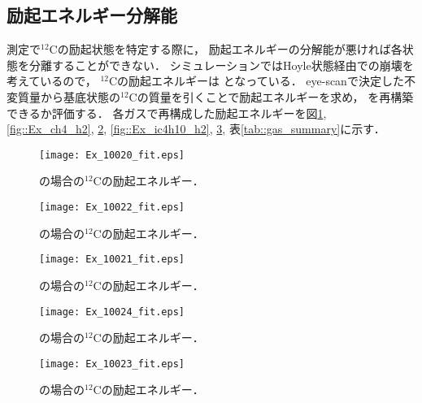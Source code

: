 \documentclass[../master]{subfiles}
\begin{document}
\subsection{励起エネルギー分解能}
測定で${}^{12}\mathrm{C}$の励起状態を特定する際に，
励起エネルギーの分解能が悪ければ各状態を分離することができない．
シミュレーションではHoyle状態経由での崩壊を考えているので，
${}^{12}\mathrm{C}$の励起エネルギーは となっている．
eye-scanで決定した不変質量から基底状態の${}^{12}\mathrm{C}$の質量を引くことで励起エネルギーを求め，
 を再構築できるか評価する．
各ガスで再構成した励起エネルギーを図\ref{fig::Ex_ch4}, \ref{fig::Ex_ch4_h2}, \ref{fig::Ex_ch4_he},
\ref{fig::Ex_ic4h10_h2}, \ref{fig::Ex_ic4h10_he}, 表\ref{tab::gas_summary}に示す．
\begin{figure}
  \centering
  \begin{minipage}{0.45\columnwidth}
    \centering
    \texttt{[image: Ex\_10020\_fit.eps]}
    \caption{\Methane の場合の${}^{12}\mathrm{C}$の励起エネルギー．}
    \label{fig::Ex_ch4}
  \end{minipage}
\end{figure}
\begin{figure}
  \centering
  \begin{minipage}{0.45\columnwidth}
    \centering
    \texttt{[image: Ex\_10022\_fit.eps]}
    \caption{\MethaneHydro の場合の${}^{12}\mathrm{C}$の励起エネルギー．}
    \label{fig::Ex_ch4_h2}
  \end{minipage}
  \begin{minipage}{0.45\columnwidth}
    \centering
    \texttt{[image: Ex\_10021\_fit.eps]}
    \caption{\MethaneHerium の場合の${}^{12}\mathrm{C}$の励起エネルギー．}
    \label{fig::Ex_ch4_he}
  \end{minipage}
\end{figure}
\begin{figure}
  \centering
  \begin{minipage}{0.45\columnwidth}
    \centering
    \texttt{[image: Ex\_10024\_fit.eps]}
    \caption{\isoButaneHydro の場合の${}^{12}\mathrm{C}$の励起エネルギー．}
    \label{fig::Ex_ic4h10_h2}
  \end{minipage}
  \begin{minipage}{0.45\columnwidth}
    \centering
    \texttt{[image: Ex\_10023\_fit.eps]}
    \caption{\isoButaneHerium の場合の${}^{12}\mathrm{C}$の励起エネルギー．}
    \label{fig::Ex_ic4h10_he}
  \end{minipage}
\end{figure}
\end{document}
